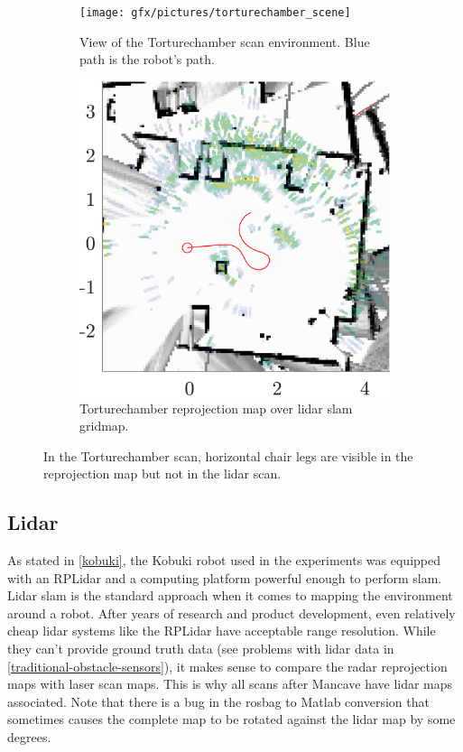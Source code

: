 \begin{figure}
    \begin{subfigure}[t]{.485\textwidth}
        \centering
        \texttt{[image: gfx/pictures/torturechamber\_scene]}
        \caption{View of the Torturechamber scan environment. Blue path is the robot's path.}
        \label{fig:chairs_scene}
    \end{subfigure}%
    \hfill%
    \begin{subfigure}[t]{.485\textwidth}
        \centering
        \includegraphics[max width=\textwidth]{gfx/results/torturechamber_map}
        \caption{Torturechamber reprojection map over lidar slam gridmap.}
        \label{fig:chairs_map}
    \end{subfigure}%
    \caption{In the Torturechamber scan, horizontal chair legs are visible in the reprojection map but not in the lidar scan.}
    \label{fig:chairlegs}
\end{figure}

\subsection{Lidar}\label{lidar-1}
As stated in \cref{kobuki}, the Kobuki robot used in the experiments was equipped with an RPLidar and a computing platform powerful enough to perform slam. Lidar slam is the standard approach when it comes to mapping the environment around a robot. After years of research and product development, even relatively cheap lidar systems like the RPLidar have acceptable range resolution. While they can't provide ground truth data (see problems with lidar data in \cref{traditional-obstacle-sensors}), it makes sense to compare the radar reprojection maps with laser scan maps. This is why all scans after Mancave have lidar maps associated.
Note that there is a bug in the rosbag to Matlab conversion that sometimes causes the complete map to be rotated against the lidar map by some degrees.
